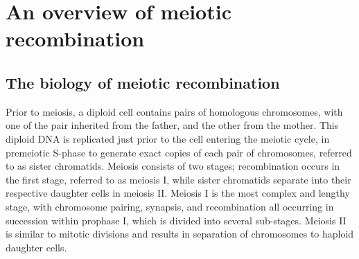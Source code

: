 \section{An overview of meiotic recombination}




\subsection{The biology of meiotic recombination}

Prior to meiosis, a diploid cell contains pairs of homologous chromosomes, with one of the pair inherited from the father, and the other from the mother.
This diploid DNA is replicated just prior to the cell entering the meiotic cycle, in premeiotic S-phase\cite{Bell2002} to generate exact copies of each pair of chromosomes, referred to as sister chromatids.
Meiosis consists of two stages; recombination occurs in the first stage, referred to as meiosis I, while sister chromatids separate into their respective daughter cells in meiosis II.
Meiosis I is the most complex and lengthy stage, with chromosome pairing, synapsis, and recombination all occurring in succession within prophase I, which is  divided into several sub-stages.
Meiosis II is similar to mitotic divisions and results in separation of chromosomes to haploid daughter cells.

